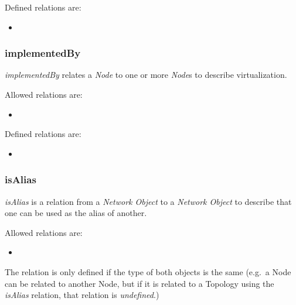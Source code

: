 Defined relations are:
\begin{itemize}
    \item {}
\end{itemize}


\subsubsection{implementedBy}%
\label{rel:implementedBy}

\emph{implementedBy} relates a \emph{Node} to one or more \emph{Node}s to describe virtualization.

Allowed relations are:
\begin{itemize}
    \item {}
\end{itemize}

Defined relations are:
\begin{itemize}
    \item {}
\end{itemize}


\subsubsection{isAlias}%
\label{rel:isAlias}

\emph{isAlias} is a relation from a \emph{Network Object} to a \emph{Network Object} to describe that one can be used as the alias of another.

Allowed relations are:
\begin{itemize}
    \item {}
\end{itemize}

The relation is only defined if the type of both objects is the same (e.g.\ a Node can be related to another Node, but if it is related to a Topology using the \emph{isAlias} relation, that relation is \emph{undefined}.)



